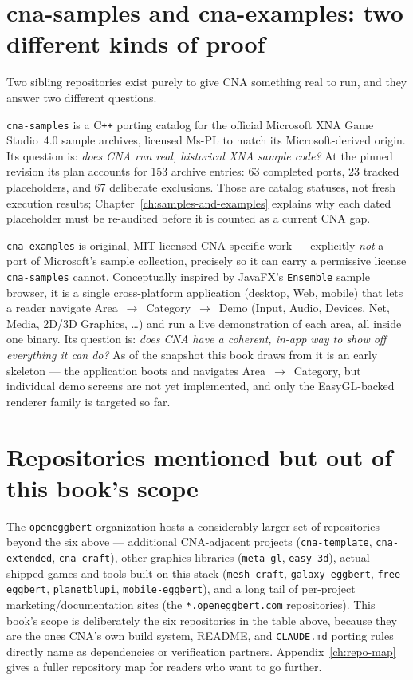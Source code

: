 \section{cna-samples and cna-examples: two different kinds of proof}

Two sibling repositories exist purely to give CNA something real to run, and they answer two
different questions.

\texttt{cna-samples} is a C\texttt{++} porting catalog for the official Microsoft XNA Game
Studio~4.0 sample archives, licensed Ms-PL to match its Microsoft-derived origin. Its question
is: \emph{does CNA run real, historical XNA sample code?}  At the pinned revision its plan
accounts for 153 archive entries: 63 completed ports, 23 tracked placeholders, and 67 deliberate
exclusions.  Those are catalog statuses, not fresh execution results; Chapter~\ref{ch:samples-and-examples}
explains why each dated placeholder must be re-audited before it is counted as a current CNA gap.

\texttt{cna-examples} is original, MIT-licensed CNA-specific work --- explicitly \emph{not}
a port of Microsoft's sample collection, precisely so it can carry a permissive license
\texttt{cna-samples} cannot. Conceptually inspired by JavaFX's \texttt{Ensemble} sample
browser, it is a single cross-platform application (desktop, Web, mobile) that lets a reader
navigate Area~$\to$~Category~$\to$~Demo (Input, Audio, Devices, Net, Media, 2D/3D Graphics,
\ldots) and run a live demonstration of each area, all inside one binary. Its question is:
\emph{does CNA have a coherent, in-app way to show off everything it can do?} As of the
snapshot this book draws from it is an early skeleton --- the application boots and
navigates Area~$\to$~Category, but individual demo screens are not yet implemented, and only
the EasyGL-backed renderer family is targeted so far.

\section{Repositories mentioned but out of this book's scope}

The \texttt{openeggbert} organization hosts a considerably larger set of repositories beyond
the six above --- additional CNA-adjacent projects (\texttt{cna-template}, \texttt{cna-extended},
\texttt{cna-craft}), other graphics libraries (\texttt{meta-gl}, \texttt{easy-3d}), actual
shipped games and tools built on this stack (\texttt{mesh-craft}, \texttt{galaxy-eggbert},
\texttt{free-eggbert}, \texttt{planetblupi}, \texttt{mobile-eggbert}), and a long tail of
per-project marketing/documentation sites (the \texttt{*.openeggbert.com} repositories). This
book's scope is deliberately the six repositories in the table above, because they are the
ones CNA's own build system, README, and \texttt{CLAUDE.md} porting rules directly name as
dependencies or verification partners. Appendix~\ref{ch:repo-map} gives a fuller repository
map for readers who want to go further.
